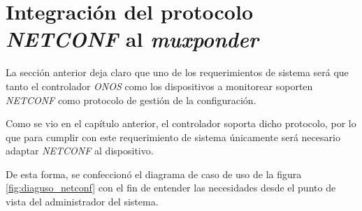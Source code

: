 \newpage

  \section{Integración del protocolo \textit{NETCONF} al \textit{muxponder}}
  La sección anterior deja claro que uno de los requerimientos de sistema será que tanto el controlador \textit{ONOS} como los dispositivos a monitorear soporten \textit{NETCONF} como protocolo de gestión de la configuración. 
  
  Como se vio en el capítulo anterior, el controlador soporta dicho protocolo, por lo que para cumplir con este requerimiento de sistema únicamente será necesario adaptar \textit{NETCONF} al dispositivo. 

  De esta forma, se confeccionó el diagrama de caso de uso de la figura \ref{fig:diaguso_netconf} con el fin de entender las necesidades desde el punto de vista del administrador del sistema. 

